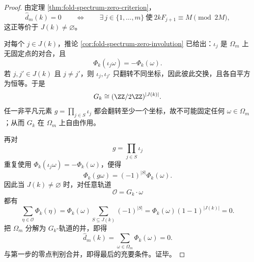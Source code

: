 \begin{proof}
由定理 \ref{thm:fold-spectrum-zero-criterion}，
\[
\widehat d_m(k)=0
\qquad\Longleftrightarrow\qquad
\exists\,j\in\{1,\dots,m\}\ \text{使}\ 2kF_{j+1}\equiv M\pmod{2M},
\]
这正等价于 \(J(k)\neq \varnothing\)。

对每个 \(j\in J(k)\)，推论 \ref{cor:fold-spectrum-zero-involution} 已给出：\(\iota_j\) 是 \(\Omega_m\) 上无固定点的对合，且
\[
\Phi_k(\iota_j\omega)=-\Phi_k(\omega).
\]
若 \(j,j'\in J(k)\) 且 \(j\neq j'\)，则 \(\iota_j,\iota_{j'}\) 只翻转不同坐标，因此彼此交换，且各自平方为恒等。于是
\[
G_k\cong (\ZZ/2\ZZ)^{|J(k)|}.
\]
任一非平凡元素 \(g=\prod_{j\in S}\iota_j\) 都会翻转至少一个坐标，故不可能固定任何 \(\omega\in\Omega_m\)；从而 \(G_k\) 在 \(\Omega_m\) 上自由作用。

再对
\[
g=\prod_{j\in S}\iota_j
\]
重复使用 \(\Phi_k(\iota_j\omega)=-\Phi_k(\omega)\)，便得
\[
\Phi_k(g\omega)=(-1)^{|S|}\Phi_k(\omega).
\]
因此当 \(J(k)\neq \varnothing\) 时，对任意轨道
\[
\mathcal O=G_k\cdot \omega
\]
都有
\[
\sum_{\eta\in\mathcal O}\Phi_k(\eta)
=
\Phi_k(\omega)\sum_{S\subseteq J(k)}(-1)^{|S|}
=
\Phi_k(\omega)(1-1)^{|J(k)|}
=0.
\]
把 \(\Omega_m\) 分解为 \(G_k\)-轨道的并，即得
\[
\widehat d_m(k)=\sum_{\omega\in\Omega_m}\Phi_k(\omega)=0.
\]
与第一步的零点判别合并，即得最后的充要条件。证毕。
\end{proof}

\endinput

